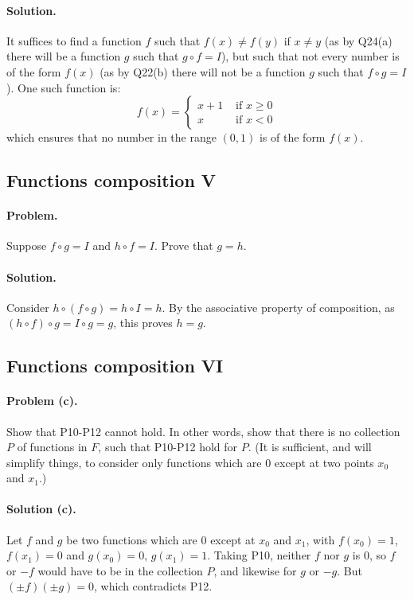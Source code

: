 \documentclass{article}
\begin{document}
\paragraph{Solution.} It suffices to find a function $f$ such that $f(x) \neq
f(y)$ if $x \neq y$ (as by Q24(a) there will be a function $g$ such that $g
\circ f = I$), but such that not every number is of the form $f(x)$ (as by
Q22(b) there will not be a function $g$ such that $f \circ g = I$). One such
function is: \begin{equation*}
  f(x) =
  \begin{cases}
    x + 1 & \text{ if } x \geq 0 \\
    x     & \text{ if } x < 0
  \end{cases}
\end{equation*}
which ensures that no number in the range $(0, 1)$ is of the form $f(x)$.

\setcounter{subsection}{25}
\subsection{Functions composition V}

\paragraph{Problem.} Suppose $f \circ g = I$ and $h \circ f = I$. Prove that $g
= h$.

\paragraph{Solution.} Consider $h \circ (f \circ g) = h \circ I = h$. By the
associative property of composition, as $(h \circ f) \circ g = I \circ g = g$,
this proves $h = g$.

\setcounter{subsection}{26}
\subsection{Functions composition VI}

\paragraph{Problem (c).} Show that P10-P12 cannot hold. In other words, show
that there is no collection $P$ of functions in $F$, such that P10-P12 hold for
$P$. (It is sufficient, and will simplify things, to consider only functions
which are 0 except at two points $x_0$ and $x_1$.)

\paragraph{Solution (c).} Let $f$ and $g$ be two functions which are 0 except
at $x_0$ and $x_1$, with $f(x_0) = 1$, $f(x_1) = 0$ and $g(x_0) = 0$, $g(x_1) =
1$. Taking P10, neither $f$ nor $g$ is 0, so $f$ or $-f$ would have to be in
the collection $P$, and likewise for $g$ or $-g$. But $(\pm f)(\pm g) = 0$,
which contradicts P12.
\end{document}
